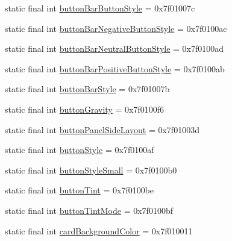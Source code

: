 \begin{CompactItemize}
\item 
static final int \hyperlink{classandroid_1_1support_1_1graphics_1_1drawable_1_1animated_1_1_r_1_1attr_7e30313906f05a82e0497e1549cf7a56}{buttonBarButtonStyle} = 0x7f01007c
\item 
static final int \hyperlink{classandroid_1_1support_1_1graphics_1_1drawable_1_1animated_1_1_r_1_1attr_0d9f5e0b384a3ffd249b2cdc32ade1e0}{buttonBarNegativeButtonStyle} = 0x7f0100ac
\item 
static final int \hyperlink{classandroid_1_1support_1_1graphics_1_1drawable_1_1animated_1_1_r_1_1attr_e74b77f8402d556c47d9dd4148f293c7}{buttonBarNeutralButtonStyle} = 0x7f0100ad
\item 
static final int \hyperlink{classandroid_1_1support_1_1graphics_1_1drawable_1_1animated_1_1_r_1_1attr_7f733c89dcc923bb997fe8096a628e47}{buttonBarPositiveButtonStyle} = 0x7f0100ab
\item 
static final int \hyperlink{classandroid_1_1support_1_1graphics_1_1drawable_1_1animated_1_1_r_1_1attr_84d50dbc0ae00f723d926436297c8899}{buttonBarStyle} = 0x7f01007b
\item 
static final int \hyperlink{classandroid_1_1support_1_1graphics_1_1drawable_1_1animated_1_1_r_1_1attr_7fce8a84e8680e42a603541a4f7a39c5}{buttonGravity} = 0x7f0100f6
\item 
static final int \hyperlink{classandroid_1_1support_1_1graphics_1_1drawable_1_1animated_1_1_r_1_1attr_e08bed35d52498cf488ee73d8709f60a}{buttonPanelSideLayout} = 0x7f01003d
\item 
static final int \hyperlink{classandroid_1_1support_1_1graphics_1_1drawable_1_1animated_1_1_r_1_1attr_1539cbdc86de5ff2bd5e8634e286c684}{buttonStyle} = 0x7f0100af
\item 
static final int \hyperlink{classandroid_1_1support_1_1graphics_1_1drawable_1_1animated_1_1_r_1_1attr_cc4b73b4499fbe55d74123666a8729ac}{buttonStyleSmall} = 0x7f0100b0
\item 
static final int \hyperlink{classandroid_1_1support_1_1graphics_1_1drawable_1_1animated_1_1_r_1_1attr_c8934315e99c543a6192b3a7e57aa42f}{buttonTint} = 0x7f0100be
\item 
static final int \hyperlink{classandroid_1_1support_1_1graphics_1_1drawable_1_1animated_1_1_r_1_1attr_b7da6435657ee12d8c680e3e82c19712}{buttonTintMode} = 0x7f0100bf
\item 
static final int \hyperlink{classandroid_1_1support_1_1graphics_1_1drawable_1_1animated_1_1_r_1_1attr_f60fcdfe4abb5cb3de92e564ab3a9827}{cardBackgroundColor} = 0x7f010011
\item 

\end{CompactItemize}
